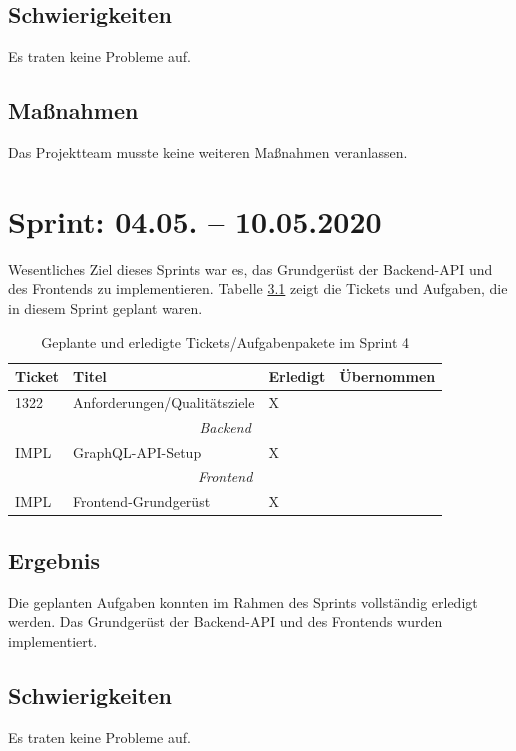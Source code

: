 \documentclass[a4paper,11pt,listof=numbered,glossary=totoc,parskip=half,toc=bib]{scrreprt}
\begin{document}
    \section{Schwierigkeiten}
    Es traten keine Probleme auf. 
    
    \section{Maßnahmen}
    Das Projektteam musste keine weiteren Maßnahmen veranlassen.
    
    \chapter{Sprint: 04.05. – 10.05.2020}

Wesentliches Ziel dieses Sprints war es, das Grundgerüst der Backend-API und des Frontends zu implementieren. Tabelle \ref{tab:sprint4} zeigt die Tickets und Aufgaben, die in diesem Sprint geplant waren.

\begin{table}    
    \begin{tabularx}{\textwidth}{lXll}
			\toprule
			\textbf{Ticket} & \textbf{Titel} & \textbf{Erledigt} & \textbf{Übernommen} \\
			\midrule
			1322	&	Anforderungen/Qualitätsziele	&	X	&		\\
					\midrule
		\multicolumn{4}{c}{\textit{Backend}}\\
		\midrule
IMPL	&	GraphQL-API-Setup	&	X	&		\\
		\midrule
		\multicolumn{4}{c}{\textit{Frontend}}\\
		\midrule
IMPL	&	Frontend-Grundgerüst	&	X	&		\\
			\bottomrule
		\end{tabularx}
\caption{Geplante und erledigte Tickets/Aufgabenpakete im Sprint 4}
\label{tab:sprint4}
\end{table} 
    
    \section{Ergebnis}
    Die geplanten Aufgaben konnten im Rahmen des Sprints vollständig erledigt werden. Das Grundgerüst der Backend-API und des Frontends wurden implementiert.
    
    \section{Schwierigkeiten}
    Es traten keine Probleme auf. 
    
\end{document}
